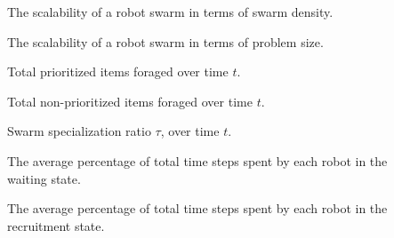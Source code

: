 \begin{description}
	\item[\parbox{\namewidth}{$SS$}] The scalability of a robot swarm in terms of swarm density.	
	
	\item[\parbox{\namewidth}{$PS$}] The scalability of a robot swarm in terms of problem size.	
	
	\item[\parbox{\namewidth}{$E^t_P$}] Total prioritized items foraged over time $t$.	

	\item[\parbox{\namewidth}{$E^t_{NP}$}] Total non-prioritized items foraged over time $t$.	
	
	\item[\parbox{\namewidth}{$\tau_t$}] Swarm specialization ratio $\tau$, over time $t$.	

	\item[\parbox{\namewidth}{$t_{wait}$}] The average percentage of total time steps spent by each robot in the waiting state.

	\item[\parbox{\namewidth}{$t_{recruitment}$}] The average percentage of total time steps spent by each robot in the recruitment state. 
	
	\item[\parbox{\namewidth}{$E_P$} The percentage of the total number of prioritized]
\end{description}
